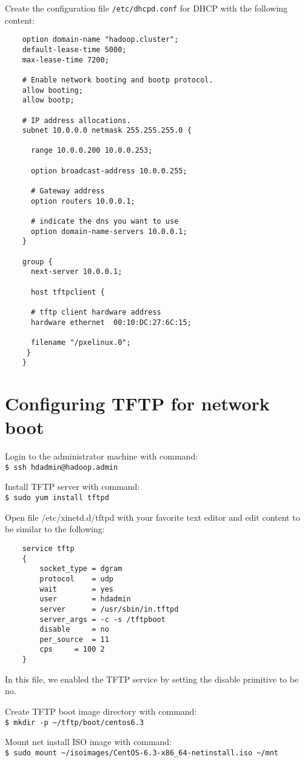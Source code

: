 Create the configuration file \verb|/etc/dhcpd.conf| for DHCP with the following content:
\begin{verbatim}
    option domain-name "hadoop.cluster";
    default-lease-time 5000;
    max-lease-time 7200;

    # Enable network booting and bootp protocol.
    allow booting;
    allow bootp;

    # IP address allocations.
    subnet 10.0.0.0 netmask 255.255.255.0 {

      range 10.0.0.200 10.0.0.253;

      option broadcast-address 10.0.0.255;

      # Gateway address
      option routers 10.0.0.1;

      # indicate the dns you want to use
      option domain-name-servers 10.0.0.1;
    }

    group {
      next-server 10.0.0.1;

      host tftpclient {

      # tftp client hardware address
      hardware ethernet  00:10:DC:27:6C:15;

      filename "/pxelinux.0";
     }
    }
\end{verbatim}

\section{Configuring TFTP for network boot}
Login to the administrator machine with command: \\
\verb|$ ssh hdadmin@hadoop.admin|

Install TFTP server with command: \\
\verb|$ sudo yum install tftpd|

Open file /etc/xinetd.d/tftpd with your favorite text editor and edit content to be similar to the following:
\begin{verbatim}
    service tftp
    {
    	socket_type	= dgram
    	protocol	= udp
    	wait		= yes
    	user		= hdadmin
    	server		= /usr/sbin/in.tftpd
    	server_args	= -c -s /tftpboot
    	disable		= no
    	per_source	= 11
    	cps		= 100 2
    }
\end{verbatim}
In this file, we enabled the TFTP service by setting the disable primitive to be no.

Create TFTP boot image directory with command: \\
\verb|$ mkdir -p ~/tftp/boot/centos6.3|

Mount net install ISO image with command: \\
\verb|$ sudo mount ~/isoimages/CentOS-6.3-x86_64-netinstall.iso ~/mnt|

